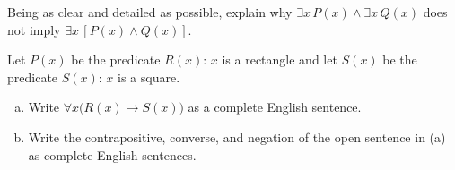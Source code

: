 \documentclass[11pt,letterpaper]{article}
\begin{document}
\newpage



 Being as clear and detailed as possible, explain why $\exists x\, P(x) \wedge \exists x\, Q(x)$ does not imply $\exists x\, [P(x) \wedge Q(x)]$. 



\newpage



 Let $P(x)$ be the predicate $R(x)$: $x$ is a rectangle and let $S(x)$ be the predicate $S(x)$: $x$ is a square. 
	\begin{enumerate}[(a)]
	\item Write $\forall x \big( R(x) \to S(x) \big)$ as a complete English sentence.
	\item Write the contrapositive, converse, and negation of the open sentence in (a) as complete English sentences. 
	\end{enumerate}
\end{document}

